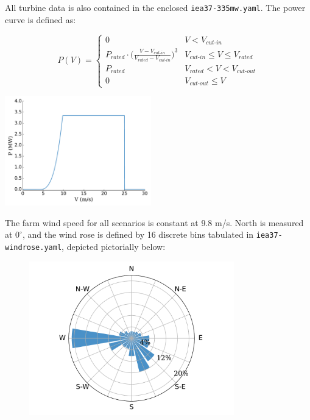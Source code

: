 \documentclass{article}
\begin{document}
        \noindent All turbine data is also contained in the enclosed \texttt{iea37-335mw.yaml}. The power curve is defined as:   

        \begin{minipage}{0.5\textwidth}
            \begin{equation*}
                P(V) = 
                \begin{cases} 
                    0 & V < V_{\textit{cut-in}} \\
                    P_{\textit{rated}}\cdot\bigg(\frac{V-V_{\textit{cut-in}}}{V_{\textit{rated}}-V_{\textit{cut-in}}}\bigg)^3 & V_{\textit{cut-in}}\leq V \leq V_{\textit{rated}} \\
                    P_{\textit{rated}} & V_{\textit{rated}} < V < V_{\textit{cut-out}} \\
                    0 & V_{\textit{cut-out}} \leq V
                \end{cases}
            \label{eq:power}
            \end{equation*}
        \end{minipage}\quad
        \begin{minipage}{0.5\textwidth}
            \includegraphics[width=2.5in]{iea37-335mw-pcurve}
        \end{minipage}

        The farm wind speed for all scenarios is constant at 9.8 m/s. North is measured at $0^{\circ}$, and the wind rose is defined by 16 discrete bins tabulated in \texttt{iea37-windrose.yaml}, depicted pictorially below:
        \vspace{-1em}
        \begin{figure}[h!]
            \centering
            \includegraphics[width=3.5in]{iea37-windrose}
        \end{figure}
        \vspace{-2em}
\end{document}
